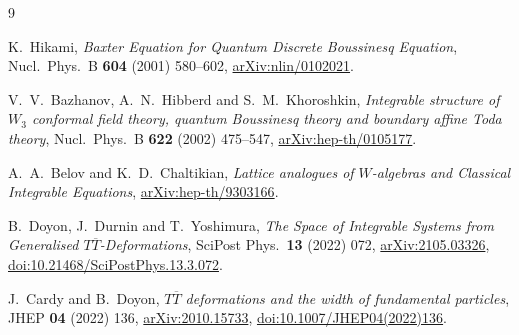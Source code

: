\documentclass[11pt,a4paper]{article}
\begin{document}
\begin{thebibliography}{9}
\raggedright
{}
K.~Hikami, \emph{Baxter Equation for Quantum Discrete Boussinesq Equation},
Nucl.\ Phys.\ B \textbf{604} (2001) 580--602,
\href{https://arxiv.org/abs/nlin/0102021}{arXiv:nlin/0102021}.

V.~V.~Bazhanov, A.~N.~Hibberd and S.~M.~Khoroshkin,
\emph{Integrable structure of $W_3$ conformal field theory, quantum
Boussinesq theory and boundary affine Toda theory},
Nucl.\ Phys.\ B \textbf{622} (2002) 475--547,
\href{https://arxiv.org/abs/hep-th/0105177}{arXiv:hep-th/0105177}.

A.~A.~Belov and K.~D.~Chaltikian,
\emph{Lattice analogues of $W$-algebras and Classical Integrable Equations},
\href{https://arxiv.org/abs/hep-th/9303166}{arXiv:hep-th/9303166}.

B.~Doyon, J.~Durnin and T.~Yoshimura,
\emph{The Space of Integrable Systems from Generalised
$T\overline T$-Deformations},
SciPost Phys.\ \textbf{13} (2022) 072,
\href{https://arxiv.org/abs/2105.03326}{arXiv:2105.03326},
\href{https://doi.org/10.21468/SciPostPhys.13.3.072}{doi:10.21468/SciPostPhys.13.3.072}.

J.~Cardy and B.~Doyon,
\emph{$T\overline T$ deformations and the width of fundamental particles},
JHEP \textbf{04} (2022) 136,
\href{https://arxiv.org/abs/2010.15733}{arXiv:2010.15733},
\href{https://doi.org/10.1007/JHEP04(2022)136}{doi:10.1007/JHEP04(2022)136}.
\end{thebibliography}
\end{document}
